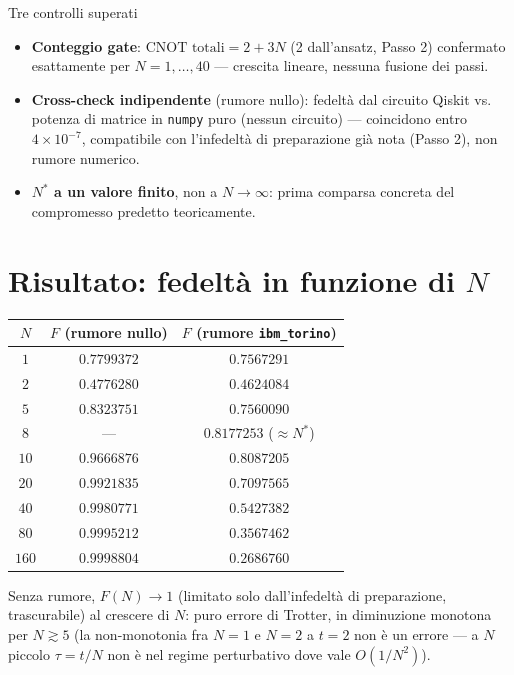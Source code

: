 \documentclass[11pt,a4paper]{article}
\begin{document}
\begin{okbox}{Tre controlli superati}
\begin{itemize}[leftmargin=1.2em,itemsep=0.2em]
\item \textbf{Conteggio gate}: $\text{CNOT totali}=2+3N$ (2 dall'ansatz,
Passo 2) confermato esattamente per $N=1,\dots,40$ --- crescita lineare,
nessuna fusione dei passi.
\item \textbf{Cross-check indipendente} (rumore nullo): fedeltà dal
circuito Qiskit vs. potenza di matrice in \texttt{numpy} puro (nessun
circuito) --- coincidono entro $4\times10^{-7}$, compatibile con
l'infedeltà di preparazione già nota (Passo 2), non rumore numerico.
\item \textbf{$N^*$ a un valore finito}, non a $N\to\infty$: prima
comparsa concreta del compromesso predetto teoricamente.
\end{itemize}
\end{okbox}

\section*{Risultato: fedeltà in funzione di $N$}

\begin{center}
\renewcommand{\arraystretch}{1.2}
\begin{tabular}{@{}ccc@{}}
\toprule
$N$ & $F$ (rumore nullo) & $F$ (rumore \texttt{ibm\_torino}) \\
\midrule
$1$ & $0.7799372$ & $0.7567291$ \\
$2$ & $0.4776280$ & $0.4624084$ \\
$5$ & $0.8323751$ & $0.7560090$ \\
$8$ & --- & $0.8177253$ \quad ($\approx N^*$) \\
$10$ & $0.9666876$ & $0.8087205$ \\
$20$ & $0.9921835$ & $0.7097565$ \\
$40$ & $0.9980771$ & $0.5427382$ \\
$80$ & $0.9995212$ & $0.3567462$ \\
$160$ & $0.9998804$ & $0.2686760$ \\
\bottomrule
\end{tabular}
\end{center}

\noindent Senza rumore, $F(N)\to1$ (limitato solo dall'infedeltà di
preparazione, trascurabile) al crescere di $N$: puro errore di Trotter, in
diminuzione monotona per $N\gtrsim5$ (la non-monotonia fra $N=1$ e $N=2$ a
$t=2$ non è un errore --- a $N$ piccolo $\tau=t/N$ non è nel regime
perturbativo dove vale $O(1/N^2)$).
\end{document}

